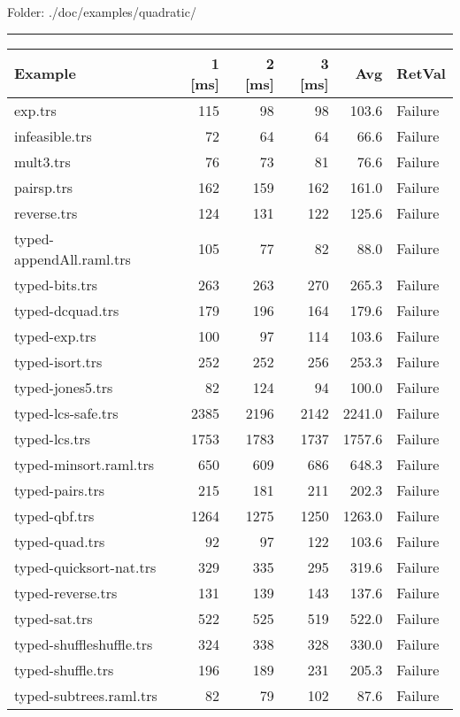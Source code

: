 \documentclass[11pt]{article}
\begin{document}
Folder: ./doc/examples/quadratic/

\rule{\linewidth}{0.5pt}

\begin{center}
\begin{tabular}{lrrrrl}
\hline
Example & 1 [ms] & 2 [ms] & 3 [ms] & Avg & RetVal\\
\hline
exp.trs & 115 & 98 & 98 & 103.6 & Failure\\
infeasible.trs & 72 & 64 & 64 & 66.6 & Failure\\
mult3.trs & 76 & 73 & 81 & 76.6 & Failure\\
pairsp.trs & 162 & 159 & 162 & 161.0 & Failure\\
reverse.trs & 124 & 131 & 122 & 125.6 & Failure\\
typed-appendAll.raml.trs & 105 & 77 & 82 & 88.0 & Failure\\
typed-bits.trs & 263 & 263 & 270 & 265.3 & Failure\\
typed-dcquad.trs & 179 & 196 & 164 & 179.6 & Failure\\
typed-exp.trs & 100 & 97 & 114 & 103.6 & Failure\\
typed-isort.trs & 252 & 252 & 256 & 253.3 & Failure\\
typed-jones5.trs & 82 & 124 & 94 & 100.0 & Failure\\
typed-lcs-safe.trs & 2385 & 2196 & 2142 & 2241.0 & Failure\\
typed-lcs.trs & 1753 & 1783 & 1737 & 1757.6 & Failure\\
typed-minsort.raml.trs & 650 & 609 & 686 & 648.3 & Failure\\
typed-pairs.trs & 215 & 181 & 211 & 202.3 & Failure\\
typed-qbf.trs & 1264 & 1275 & 1250 & 1263.0 & Failure\\
typed-quad.trs & 92 & 97 & 122 & 103.6 & Failure\\
typed-quicksort-nat.trs & 329 & 335 & 295 & 319.6 & Failure\\
typed-reverse.trs & 131 & 139 & 143 & 137.6 & Failure\\
typed-sat.trs & 522 & 525 & 519 & 522.0 & Failure\\
typed-shuffleshuffle.trs & 324 & 338 & 328 & 330.0 & Failure\\
typed-shuffle.trs & 196 & 189 & 231 & 205.3 & Failure\\
typed-subtrees.raml.trs & 82 & 79 & 102 & 87.6 & Failure\\
\hline
\end{tabular}

\end{center}
\end{document}
